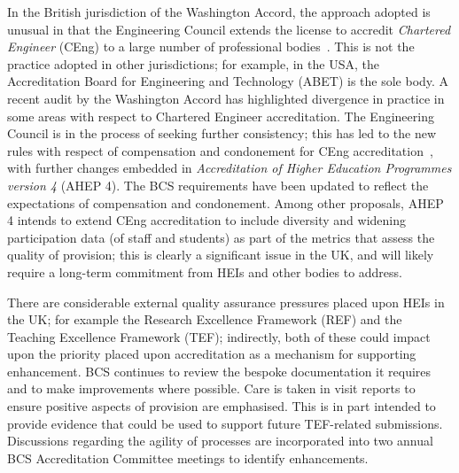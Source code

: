 \documentclass[sigconf]{acmart}
\begin{document}
In the British jurisdiction of the Washington Accord, the approach
adopted is unusual in that the Engineering Council extends the license
to accredit {\emph{Chartered Engineer}} (CEng) to a large number of
professional bodies~\cite{EC2019}. This is not the practice adopted in
other jurisdictions; for example, in the USA, the Accreditation Board
for Engineering and Technology (ABET) is the sole body. A recent audit
by the Washington Accord has highlighted divergence in practice in
some areas with respect to Chartered Engineer accreditation. The
Engineering Council is in the process of seeking further consistency;
this has led to the new rules with respect of compensation and
condonement for CEng accreditation~\cite{EC2018}, with further changes
embedded in {\emph{Accreditation of Higher Education Programmes
version 4}} (AHEP 4). The BCS requirements have been updated to
reflect the expectations of compensation and condonement. Among other
proposals, AHEP 4 intends to extend CEng accreditation to include
diversity and widening participation data (of staff and students) as
part of the metrics that assess the quality of provision; this is
clearly a significant issue in the UK, and will likely require a
long-term commitment from HEIs and other bodies to address.

There are considerable external quality assurance
pressures placed upon HEIs in the UK; for example the Research
Excellence Framework (REF) and the Teaching Excellence Framework
(TEF); indirectly, both of these could impact upon the priority placed
upon accreditation as a mechanism for supporting enhancement. BCS
continues to review the bespoke documentation it requires and to make
improvements where possible. Care is taken in visit reports to ensure
positive aspects of provision are emphasised. This is in part intended
to provide evidence that could be used to support future TEF-related
submissions. Discussions regarding the agility of processes are
incorporated into two annual BCS Accreditation Committee meetings to
identify enhancements.
\end{document}
